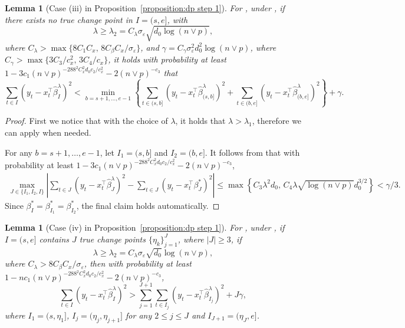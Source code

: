 \documentclass[twoside]{article}
\newtheorem{lemma}[theorem]{Lemma}
\begin{document}
\begin{lemma}[Case (iii) in Proposition~\ref{proposition:dp step 1}] \label{lemma:no change point}
For , under , if there exists no true change point in $I = (s, e]$, with 
	\[
		\lambda \geq \lambda_2 = C_{\lambda}\sigma_{\varepsilon} \sqrt{d_0 \log(n \vee p)}, 
	\]
	where $C_{\lambda} > \max\{8C_1C_x, \, 8C_{\beta}C_x/\sigma_{\varepsilon}\}$, and $\gamma = C_{\gamma} \sigma_{\varepsilon}^2 d_0^2\log(n \vee p)$, where $C_{\gamma} > \max\{3C_3/c_x^2, \, 3C_4/c_x\}$, it holds with probability at least $1 - 3c_1 (n \vee p)^{-288^2C_x^2d_0c_2/c_x^2} - 2(n \vee p)^{-c_3}$ that
	\[
		\sum_{t \in I}(y_t - x_t^{\top} \widehat \beta^\lambda_I)^2 < \min_{b = s + 1, \ldots, e - 1} \left\{\sum_{t \in (s, b]}(y_t - x_t^{\top} \widehat \beta^\lambda_{(s, b]})^2 + \sum_{t \in (b, e]} (y_t - x_t^{\top} \widehat \beta^\lambda_{(b, e]})^2 \right\} + \gamma.
	\]
\end{lemma}
\begin{proof}
First we notice that with the choice of $\lambda$, it holds that $\lambda > \lambda_1$, therefore we can apply  when needed.

For any $b = s + 1, \ldots, e - 1$, let $I_1 = (s, b]$ and $I_2 = (b, e]$.  It follows from  that with probability at least $1 - 3c_1 (n \vee p)^{-288^2C_x^2d_0c_2/c_x^2} - 2(n \vee p)^{-c_3}$, 
	\begin{align*}
		\max_{J \in \{I_1, I_2, I\}} \left | \sum_{t\in J} (y_t -x_t^{\top} \widehat \beta^\lambda_J)^2  - \sum_{t \in J} (y_t -x_t^{\top}   \beta^*_J)^2 \right| \leq \max\left\{C_3\lambda^2 d_0, \, C_4 \lambda \sqrt{\log(n \vee p)} d_0^{3/2} \right\} < \gamma/3.
	\end{align*}
	Since $ \beta^*_ {I} = \beta^*_ {I_1} = \beta^*_ {I_2}$, the final claim holds automatically.

\end{proof}


\begin{lemma}[Case (iv) in Proposition~\ref{proposition:dp step 1}] \label{lemma:three change point}
For , under , if $I = (s, e]$ contains  $J$ true change points $\{ \eta_{k}\}_{j=1}^J$, where $|J| \ge 3$, if
	\[
		\lambda \geq \lambda_2 = C_{\lambda}\sigma_{\varepsilon} \sqrt{d_0} \log(n \vee p), 
	\]
	where $C_{\lambda} > 8C_{\beta}C_x/\sigma_{\varepsilon}$, then with probability at least $1 - nc_1 (n \vee p)^{-288^2C_x^2d_0c_2/c_x^2} - 2(n \vee p)^{-c_3}$,
	\[
		\sum_{t\in I } (y_t -x_t^{\top} \widehat \beta^\lambda_ I )^2 > \sum_{j=1}^{J+1} \sum_{t\in I_j  } (y_t -x_t^{\top} \widehat \beta^\lambda_ {I_j}  )^2 + J \gamma, 
	\]
	where $I_1 =(s,\eta_{1}] $, $I_j = (\eta_{j},\eta_{j+1}] $ for any $2\le j \le J $ and $I_{J+1} = (\eta_J, e]$.
\end{lemma} 
\end{document}
